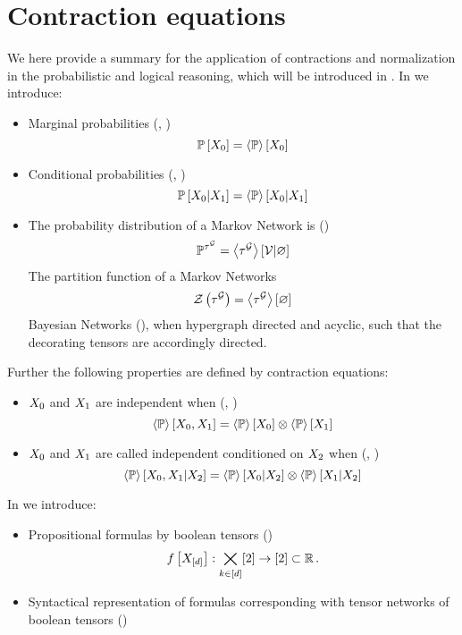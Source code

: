 \chapter{Contraction equations}

We here provide a summary for the application of contractions and normalization in the probabilistic and logical reasoning, which will be introduced in .
In  we introduce:
\begin{itemize}
	\item Marginal probabilities (, )
		\[ \mathbb{P}\left[X_{0}\right] = \left\langle \mathbb{P}\right\rangle \left[ X_{0} \right] \]
	\item Conditional probabilities (, )
		\[ \mathbb{P}\left[X_{0}|X_{1}\right] = \left\langle \mathbb{P}\right\rangle \left[ X_{0} | X_{1} \right] \]
	\item The probability distribution of a Markov Network is ()
		\begin{align*}
			\mathbb{P}^{\tau^{\mathcal{G}}} = \left\langle \tau^{\mathcal{G}}\right\rangle \left[ \mathcal{V} | \varnothing \right]
		\end{align*}
		The partition function of a Markov Networks
		\begin{align*}
			\mathcal{Z}\left(\tau^{\mathcal{G}}\right) = \left\langle \tau^{\mathcal{G}}\right\rangle \left[ \varnothing \right]
		\end{align*}
		Bayesian Networks (), when hypergraph directed and acyclic, such that the decorating tensors are accordingly directed.
\end{itemize}

Further the following properties are defined by contraction equations:
\begin{itemize}
	\item $X_{0}$ and $X_{1}$ are independent when (, )
		\[  \left\langle \mathbb{P}\right\rangle \left[ X_{0},X_{1} \right]
		=  \left\langle \mathbb{P}\right\rangle \left[ X_{0} \right]
			\otimes  \left\langle \mathbb{P}\right\rangle \left[ X_{1} \right] \]
	\item $X_{0}$ and $X_{1}$ are called independent conditioned on $X_{2}$ when (, )
		\[ \left\langle \mathbb{P}\right\rangle \left[ X_{0},X_{1} | X_{2} \right]
		= \left\langle \mathbb{P}\right\rangle \left[ X_{0} | X_{2} \right]
		\otimes \left\langle \mathbb{P}\right\rangle \left[ X_{1} | X_{2} \right] \]
\end{itemize}

In  we introduce:
\begin{itemize}
	\item Propositional formulas by boolean tensors ()
		\[ f\left[X_{[d]}\right] : \bigtimes_{k\in[d]}[2] \rightarrow [2] \subset \mathbb{R} \, . \]
	\item Syntactical representation of formulas corresponding with tensor networks of boolean tensors ()
\end{itemize}